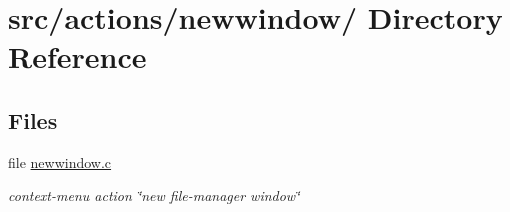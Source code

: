 \hypertarget{dir_000035}{
\section{src/actions/newwindow/ Directory Reference}
\label{dir_000035}
}
\subsection*{Files}
\begin{CompactItemize}
\item 
file \hyperlink{newwindow_8c}{newwindow.c}
\begin{CompactList}\small\item\em context-menu action \char`\"{}new file-manager window\char`\"{} \item\end{CompactList}

\end{CompactItemize}
